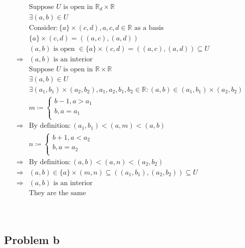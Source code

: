 \documentclass{article}
\begin{document}
\begin{equation*}
    \begin{split}
        &\text{Suppose }U\text{ is open in }\mathbb{R} _d\times \mathbb{R} \\
        &\exists(a,b)\in U\\
        &\text{Consider}:\{a\}\times(c,d),a,c,d\in \mathbb{R} \text{ as a basis}\\
        &\{a\}\times(c,d)=((a,c),(a,d))\\
        &(a,b)\text{ is open }\in \{a\}\times(c,d)=((a,c),(a,d))\subseteq U\\
        \Rightarrow&(a,b)\text{ is an interior}\\
        &\text{Suppose }U\text{ is open in }\mathbb{R}\times \mathbb{R}\\
        &\exists(a,b)\in U\\
        &\exists(a_1,b_1)\times(a_2,b_2),a_1,a_2,b_1,b_2\in \mathbb{R}:(a,b)\in(a_1,b_1)\times(a_2,b_2)\\
        &m\coloneqq\begin{cases}
            b-1,a>a_1\\
            b,a=a_1\\
        \end{cases}\\
        \Rightarrow&\text{By definition}:(a_1,b_1)<(a,m)<(a,b)\\
        &n\coloneqq\begin{cases}
            b+1,a<a_2\\
            b,a=a_2\\
        \end{cases}\\
        \Rightarrow&\text{By definition}:(a,b)<(a,n)<(a_2,b_2)\\
        \Rightarrow&(a,b)\in \{a\}\times(m,n)\subseteq ((a_1,b_1),(a_2,b_2))\subseteq U\\
        \Rightarrow&(a,b)\text{ is an interior}\\
        &\text{They are the same}\\
    \end{split}
\end{equation*}

~

\subsection*{Problem b}

~
\end{document}
